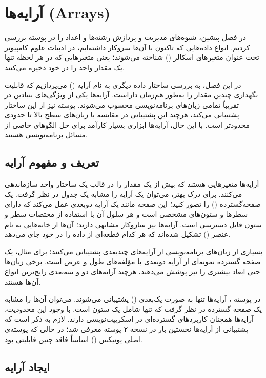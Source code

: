 \chapter{آرایه‌ها (Arrays)}

در فصل پیشین، شیوه‌های مدیریت و پردازش رشته‌ها و اعداد را در پوسته بررسی کردیم. انواع داده‌هایی که تاکنون با آن‌ها سروکار داشته‌ایم، در ادبیات علوم کامپیوتر تحت عنوان متغیرهای اسکالر () شناخته می‌شوند؛ یعنی متغیرهایی که در هر لحظه تنها یک مقدار واحد را در خود ذخیره می‌کنند.

در این فصل، به بررسی ساختار داده دیگری به نام آرایه () می‌پردازیم که قابلیت نگهداری چندین مقدار را به‌طور هم‌زمان داراست. آرایه‌ها یکی از ویژگی‌های بنیادین در تقریباً تمامی زبان‌های برنامه‌نویسی محسوب می‌شوند. پوسته  نیز از این ساختار پشتیبانی می‌کند، هرچند این پشتیبانی در مقایسه با زبان‌های سطح بالا تا حدودی محدودتر است. با این حال، آرایه‌ها ابزاری بسیار کارآمد برای حل الگوهای خاصی از مسائل برنامه‌نویسی هستند.

\section{تعریف و مفهوم آرایه}

آرایه‌ها متغیرهایی هستند که بیش از یک مقدار را در قالب یک ساختار واحد سازماندهی می‌کنند. برای درک بهتر، می‌توان یک آرایه را مشابه یک جدول در نظر گرفت. یک صفحه‌گسترده () را تصور کنید؛ این صفحه مانند یک آرایه دوبعدی عمل می‌کند که دارای سطرها و ستون‌های مشخصی است و هر سلول آن با استفاده از مختصات سطر و ستون قابل دسترسی است. آرایه‌ها نیز سازوکار مشابهی دارند؛ آن‌ها از خانه‌هایی به نام عنصر () تشکیل شده‌اند که هر کدام قطعه‌ای از داده را در خود جای می‌دهد.

بسیاری از زبان‌های برنامه‌نویسی از آرایه‌های چندبعدی پشتیبانی می‌کنند؛ برای مثال، یک صفحه گسترده نمونه‌ای از آرایه دوبعدی با مؤلفه‌های طول و عرض است. برخی زبان‌ها حتی ابعاد بیشتری را نیز پوشش می‌دهند، هرچند آرایه‌های دو و سه‌بعدی رایج‌ترین انواع آن‌ها هستند.

در پوسته ، آرایه‌ها تنها به صورت یک‌بعدی () پشتیبانی می‌شوند. می‌توان آن‌ها را مشابه یک صفحه گسترده در نظر گرفت که تنها شامل یک ستون است. با وجود این محدودیت، آرایه‌ها همچنان کاربردهای گسترده‌ای در اسکریپت‌نویسی دارند. لازم به ذکر است که پشتیبانی از آرایه‌ها نخستین بار در نسخه ۲ پوسته  معرفی شد؛ در حالی که پوسته‌ی اصلی یونیکس () اساساً فاقد چنین قابلیتی بود.

\section{ایجاد آرایه}

